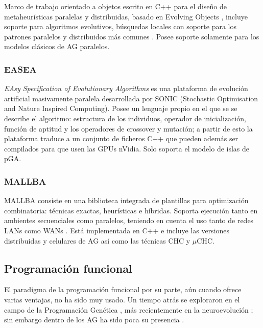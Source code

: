 \documentclass[runningheads]{llncs}
\begin{document}
Marco de trabajo orientado a objetos escrito en C++ para el diseño de metaheurísticas paralelas y distribuidas, basado en Evolving Objects \cite{Keijzer2001}, incluye soporte para algoritmos evolutivos, búsquedas locales con soporte para los patrones paralelos y distribuidos más comunes \cite{PARADISEO}. Posee soporte solamente para los modelos clásicos de AG paralelos.


\subsubsection{EASEA}

\emph{EAsy Specification of Evolutionary Algorithms} es una plataforma de evolución artificial masivamente paralela desarrollada por SONIC (Stochastic Optimisation and Nature Inspired Computing). Posee un lenguaje propio en el que se se describe el algoritmo: estructura de los individuos, operador de inicialización, función de aptitud y los operadores de crossover y mutación; a partir de esto la plataforma traduce a un conjunto de ficheros C++ que pueden además ser compilados para que usen las GPUs nVidia. Solo soporta el modelo de islas de pGA.

\subsubsection{MALLBA}

MALLBA consiste en una biblioteca integrada de plantillas para optimización combinatoria: técnicas exactas, heurísticas e híbridas. Soporta ejecución tanto en ambientes secuenciales como paralelos, teniendo en cuenta el uso tanto de redes LANs como WANs \cite{MALLBA}. Está implementada en C++ e incluye las versiones distribuidas y celulares de AG así como las técnicas CHC y $\mu$CHC.

\subsection{Programación funcional}

El paradigma de la programación funcional por su parte, aún cuando ofrece varias ventajas, no ha sido muy usado. Un tiempo atrás se exploraron en el campo de la Programación Genética \cite{Briggs:2008:FGP:1375341.1375345,Huelsbergen:1996:TSE:1595536.1595579,walsh:1999:AFSFESIHLP}, más recientemente en la neuroevolución  \cite{Sher2013}; sin embargo dentro de los AG ha sido poca su presencia \cite{Hawkins:2001:GFG:872017.872197}.
\end{document}
